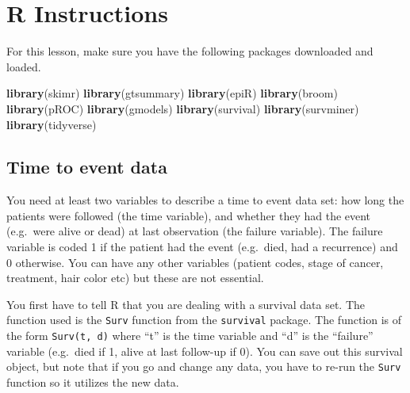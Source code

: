 \documentclass[]{book}
\newenvironment{Shaded}{\begin{snugshade}}{\end{snugshade}}
\newcommand{\CommentTok}[1]{\textcolor[rgb]{0.56,0.35,0.01}{\textit{#1}}}
\newcommand{\KeywordTok}[1]{\textcolor[rgb]{0.13,0.29,0.53}{\textbf{#1}}}
\newcommand{\NormalTok}[1]{#1}
\newcommand{\OperatorTok}[1]{\textcolor[rgb]{0.81,0.36,0.00}{\textbf{#1}}}
\newcommand{\StringTok}[1]{\textcolor[rgb]{0.31,0.60,0.02}{#1}}
\begin{document}
\hypertarget{r-instructions-6}{%
\section{R Instructions}\label{r-instructions-6}}

For this lesson, make sure you have the following packages downloaded and loaded.

\begin{Shaded}
\begin{Highlighting}[]
\KeywordTok{library}\NormalTok{(skimr)}
\KeywordTok{library}\NormalTok{(gtsummary)}
\KeywordTok{library}\NormalTok{(epiR)}
\KeywordTok{library}\NormalTok{(broom)}
\KeywordTok{library}\NormalTok{(pROC)}
\KeywordTok{library}\NormalTok{(gmodels)}
\KeywordTok{library}\NormalTok{(survival)}
\KeywordTok{library}\NormalTok{(survminer)}
\KeywordTok{library}\NormalTok{(tidyverse)}
\end{Highlighting}
\end{Shaded}

\hypertarget{time-to-event-data}{%
\subsection{Time to event data}\label{time-to-event-data}}

You need at least two variables to describe a time to event data set: how long the patients were followed (the time variable), and whether they had the event (e.g.~were alive or dead) at last observation (the failure variable). The failure variable is coded 1 if the patient had the event (e.g.~died, had a recurrence) and 0 otherwise. You can have any other variables (patient codes, stage of cancer, treatment, hair color etc) but these are not essential.

You first have to tell R that you are dealing with a survival data set. The function used is the \texttt{Surv} function from the \texttt{survival} package. The function is of the form \texttt{Surv(t,\ d)} where ``t'' is the time variable and ``d'' is the ``failure'' variable (e.g.~died if 1, alive at last follow-up if 0). You can save out this survival object, but note that if you go and change any data, you have to re-run the \texttt{Surv} function so it utilizes the new data.

\begin{Shaded}
\end{Shaded}
\end{document}
